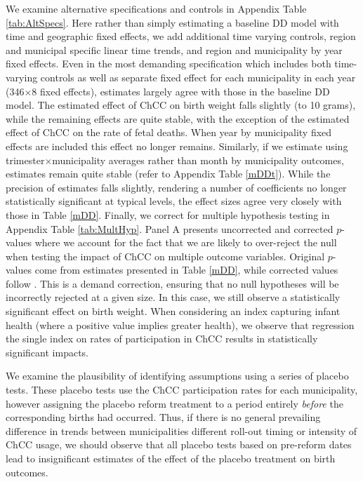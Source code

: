 \documentclass[12pt]{article}
\begin{document}
\begin{spacing}{1.4}
We examine alternative specifications and controls in Appendix Table
\ref{tab:AltSpecs}.  Here rather than simply estimating a baseline
DD model with time and geographic fixed effects, we add additional
time varying controls, region and municipal specific linear time
trends, and region and municipality by year fixed effects.  Even in
the most demanding specification which includes both time-varying
controls as well as separate fixed effect for each municipality in
each year (346$\times$8 fixed effects), estimates largely agree
with those in the baseline DD model.  The estimated effect of ChCC
on birth weight falls slightly (to 10 grams), while the remaining
effects are quite stable, with the exception of the estimated effect
of ChCC on the rate of fetal deaths.  When year by municipality
fixed effects are included this effect no longer remains.  Similarly,
if we estimate using trimester$\times$municipality averages rather
than month by municipality outcomes, estimates remain quite stable
(refer to Appendix Table \ref{mDDt}).  While the precision of
estimates falls slightly, rendering a number of coefficients no longer
statistically significant at typical levels, the effect sizes agree
very closely with those in Table \ref{mDD}. %
Finally, we correct for multiple hypothesis testing in Appendix
Table \ref{tab:MultHyp}.  Panel A presents uncorrected and
corrected $p$-values where we account for the fact that we are
likely to over-reject the null when testing the impact of ChCC
on multiple outcome variables.  Original $p$-values come from
estimates presented in Table \ref{mDD}, while corrected values
follow \citet{RomanoWolf2005}.  This is a demand correction,
ensuring that no null hypotheses will be incorrectly rejected
at a given size.  In this case, we still observe a statistically
significant effect on birth weight.  When considering an index
capturing infant health (where a positive value implies greater
health), we observe that regression the single index on rates
of participation in ChCC results in statistically significant
impacts.

We examine the plausibility of identifying assumptions using a
series of placebo tests.  These placebo tests use the ChCC
participation rates for each municipality, however assigning the
placebo reform treatment to a period entirely \emph{before} the
corresponding births had occurred.  Thus, if there is no general
prevailing difference in trends between municipalities different
roll-out timing or intensity of ChCC usage, we should observe
that all placebo tests based on pre-reform dates lead to
insignificant estimates of the effect of the placebo treatment on
birth outcomes.


\end{spacing}
\end{document}
